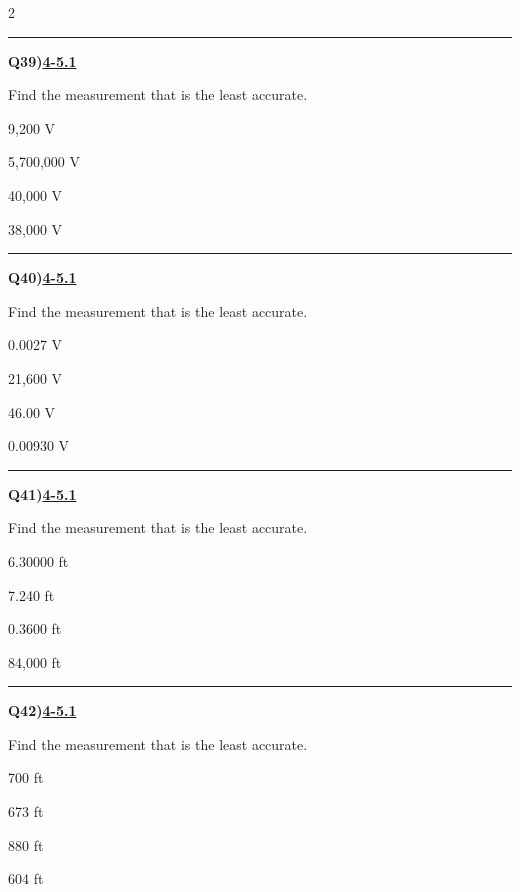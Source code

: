 \documentclass[11pt]{article}
\newenvironment{Qbox}[2]{%
  \par\medskip\noindent\begin{minipage}{\linewidth}%
  \hrule\medskip%
  \textbf{Q#1)}\hfill\textbf{\underline{#2}}\par\smallskip%
}{\par\end{minipage}\par\medskip}
\begin{document}
\begin{multicols}{2}
\begin{Qbox}{39}{4-5.1}
Find the measurement that is the least accurate.
\begin{choices}
  \item 9,200 V
  \item 5,700,000 V
  \item 40,000 V
  \item 38,000 V
\end{choices}
\end{Qbox}

\begin{Qbox}{40}{4-5.1}
Find the measurement that is the least accurate.
\begin{choices}
  \item 0.0027 V
  \item 21,600 V
  \item 46.00 V
  \item 0.00930 V
\end{choices}
\end{Qbox}

\begin{Qbox}{41}{4-5.1}
Find the measurement that is the least accurate.
\begin{choices}
  \item 6.30000 ft
  \item 7.240 ft
  \item 0.3600 ft
  \item 84,000 ft
\end{choices}
\end{Qbox}

\begin{Qbox}{42}{4-5.1}
Find the measurement that is the least accurate.
\begin{choices}
  \item 700 ft
  \item 673 ft
  \item 880 ft
  \item 604 ft
\end{choices}
\end{Qbox}


\end{multicols}
\end{document}
